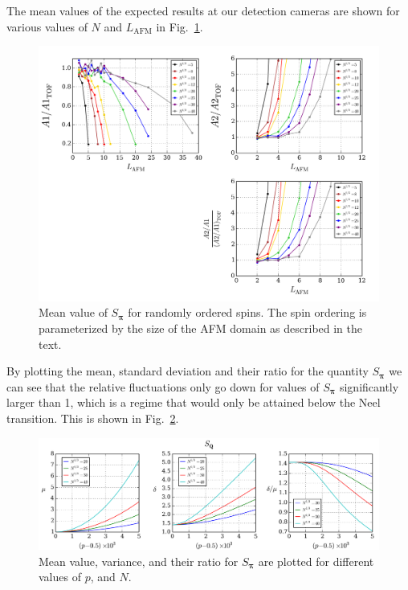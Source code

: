 \documentclass[11pt,letter]{article}
\newcommand{\bv}[1]{\ensuremath{\bm{#1}}}
\begin{document}
The mean values of the expected results at our detection cameras are shown for
various values of $N$ and $L_{\text{AFM}}$ in Fig.~\ref{fig:crystal-size-mean}. 
\begin{figure}
\centering \includegraphics[width=\textwidth]{figures_140308/CrystalSize_plot.png}
\caption[Mean value of $S_{\bv{\pi}}$]{\small Mean value of $S_{\bv{\pi}}$
for randomly ordered spins.  The spin ordering is parameterized by the size of
the AFM domain as described in the text. }
\label{fig:crystal-size-mean}
\end{figure}

By plotting the mean, standard deviation and their ratio for the quantity
$S_{\bv{\pi}}$ we can see that the relative fluctuations only go down for
values of $S_{\bv{\pi}}$ significantly larger than 1,  which is a regime that
would only be attained below the Neel transition.   This is shown in
Fig.~\ref{fig:spi-variance}.
\begin{figure}
\centering \includegraphics[width=\textwidth]{figures_140308/spi-variance.png}
\caption[Mean value and variance of $S_{\bv{\pi}}$]{\small Mean value,
variance, and their ratio for $S_{\bv{\pi}}$ are plotted for different values
of $p$, and $N$.  }
\label{fig:spi-variance}
\end{figure}
\end{document}
